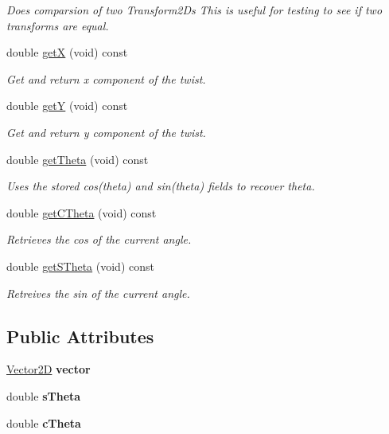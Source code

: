 \begin{DoxyCompactItemize}
\begin{DoxyCompactList}\small\item\em Does comparsion of two Transform2\+Ds This is useful for testing to see if two transforms are equal. \end{DoxyCompactList}\item 
double \hyperlink{classrigid2d_1_1Transform2D_a2670394279fdfe595d859a1deab2b93f}{getX} (void) const
\begin{DoxyCompactList}\small\item\em Get and return x component of the twist. \end{DoxyCompactList}\item 
double \hyperlink{classrigid2d_1_1Transform2D_a8557f7ba90f5bc8ae468b56662e518e3}{getY} (void) const
\begin{DoxyCompactList}\small\item\em Get and return y component of the twist. \end{DoxyCompactList}\item 
double \hyperlink{classrigid2d_1_1Transform2D_aa380770351c67c0cd4410ceeb82b7c0d}{get\+Theta} (void) const
\begin{DoxyCompactList}\small\item\em Uses the stored cos(theta) and sin(theta) fields to recover theta. \end{DoxyCompactList}\item 
double \hyperlink{classrigid2d_1_1Transform2D_ae713c7af107cfd4ba9819f1a16e743d1}{get\+C\+Theta} (void) const
\begin{DoxyCompactList}\small\item\em Retrieves the cos of the current angle. \end{DoxyCompactList}\item 
double \hyperlink{classrigid2d_1_1Transform2D_a980917a1d86f290bd931dfa3eb78144f}{get\+S\+Theta} (void) const
\begin{DoxyCompactList}\small\item\em Retreives the sin of the current angle. \end{DoxyCompactList}\end{DoxyCompactItemize}
\subsection*{Public Attributes}
\begin{DoxyCompactItemize}
\item 
\mbox{\label{classrigid2d_1_1Transform2D_a660fa2c66318224d29ac888e149e3f5d}} 
\hyperlink{structrigid2d_1_1Vector2D}{Vector2D} {\bfseries vector}
\item 
\mbox{\label{classrigid2d_1_1Transform2D_aecc32fb172617e9283d2fb6ab63093e0}} 
double {\bfseries s\+Theta}
\item 
\mbox{\label{classrigid2d_1_1Transform2D_a2af0344e3d1b6e551317ff6784661ac5}} 
double {\bfseries c\+Theta}
\end{DoxyCompactItemize}
